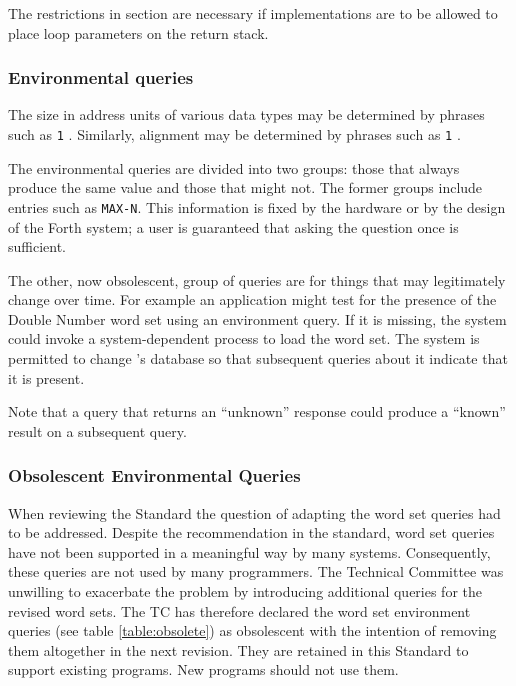 The restrictions in section 
are necessary if implementations are to be allowed to place loop
parameters on the return stack.

\addtocounter{subsubsection}{2}
\subsubsection{Environmental queries} %

The size in address units of various data types may be determined by
phrases such as \texttt{1} . Similarly, alignment may be
determined by phrases such as \texttt{1} .

The environmental queries are divided into two groups: those that
always produce the same value and those that might not. The former
groups include entries such as \texttt{MAX-N}. This information is
fixed by the hardware or by the design of the Forth system; a user
is guaranteed that asking the question once is sufficient.

The other, now obsolescent, group of queries are for things that may
legitimately change over time. For example an application might test
for the presence of the Double Number word set using an environment
query.  If it is missing, the system could invoke a system-dependent
process to load the word set. The system is permitted to change
's database so that subsequent queries about
it indicate that it is present.

Note that a query that returns an ``unknown'' response could produce
a ``known'' result on a subsequent query.

\subsubsection{Obsolescent Environmental Queries} %
\label{rat:obsolet}

When reviewing the  Standard the question of adapting the word set
queries had to be addressed.  Despite the recommendation in the
 standard, word set queries have not been
supported in a meaningful way by many systems.  Consequently, these
queries are not used by many programmers.  The Technical Committee
was unwilling to exacerbate the problem by introducing additional
queries for the revised word sets.  The TC has therefore declared
the word set environment queries (see table \ref{table:obsolete}) as
obsolescent with the intention of removing them altogether in the
next revision.
They are retained in this Standard to support existing 
programs.  New programs should not use them.

